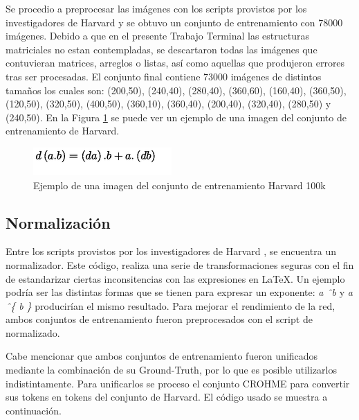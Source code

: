 Se procedio a preprocesar las imágenes con los scripts provistos por los investigadores de Harvard y se obtuvo un conjunto de entrenamiento con 78000 imágenes. Debido a que en el presente Trabajo Terminal las estructuras matriciales no estan contempladas, se descartaron todas las imágenes que contuvieran matrices, arreglos o listas, así como aquellas que produjeron errores tras ser procesadas. El conjunto final contiene 73000 imágenes de distintos tamaños los cuales son: (200,50), (240,40), (280,40), (360,60), (160,40), (360,50), (120,50), (320,50), (400,50), (360,10), (360,40), (200,40), (320,40), (280,50) y (240,50). En la Figura \ref{fig:harvard-example} se puede ver un ejemplo de una imagen del conjunto de entrenamiento de Harvard.

\begin{figure}[H]
	\centering
	\includegraphics{capitulo5/dataset/harvard}
	\caption{Ejemplo de una imagen del conjunto de entrenamiento Harvard 100k}
	\label{fig:harvard-example}
\end{figure}

\subsection{Normalización}

Entre los scripts provistos por los investigadores de Harvard \cite{harvard-scripts}, se encuentra un normalizador. Este código, realiza una serie de transformaciones seguras con el fin de estandarizar ciertas inconsitencias con las expresiones en \LaTeX{}. Un ejemplo podría ser las distintas formas que se tienen para expresar un exponente: \textit{a \^\ b} y \textit{a \^\ \{ b \}} producirían el mismo resultado. Para mejorar el rendimiento de la red, ambos conjuntos de entrenamiento fueron preprocesados con el script de normalizado.

Cabe mencionar que ambos conjuntos de entrenamiento fueron unificados mediante la combinación de su Ground-Truth, por lo que es posible utilizarlos indistintamente. Para unificarlos se proceso el conjunto CROHME para convertir sus tokens en tokens del conjunto de Harvard. El código usado se muestra a continuación.



\newpage


